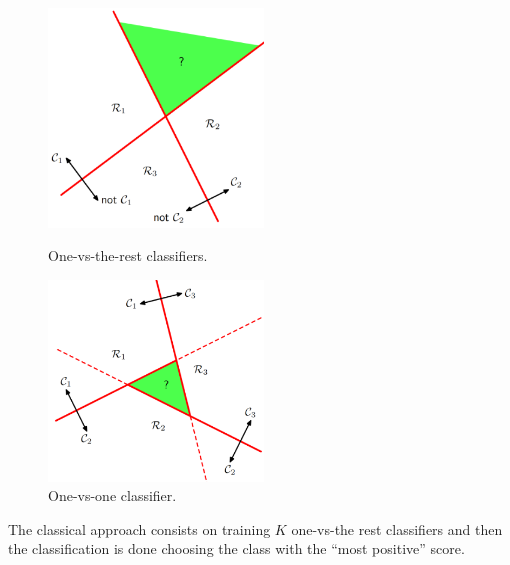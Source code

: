 \begin{figure}[!h]
	\begin{minipage}[t]{0.5\linewidth}
		\centering
		\includegraphics[width=0.51\textwidth]{img/onevsrest.png}
		\caption{One-vs-the-rest classifiers.}
	\end{minipage}
	\hspace{0.1cm}
	\begin{minipage}[t]{0.5\linewidth} 
		\centering
		\includegraphics[width=0.51\textwidth]{img/onevsone.png}
		\caption{One-vs-one classifier.}
	\end{minipage}        
\end{figure} 
The classical approach consists on training $K$ one-vs-the rest classifiers and then the classification is done choosing the class with the ``most positive'' score.

